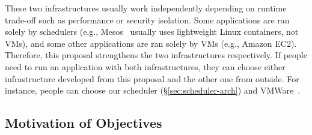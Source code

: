 These two infrastructures usually work independently depending on 
runtime trade-off such as performance or security isolation. Some applications 
are ran solely by schedulers (e.g., Mesos~\cite{mesos:nsdi11} usually uses 
lightweight Linux containers, not VMs), and some other applications are ran 
solely by VMs (e.g., Amazon EC2). Therefore, this proposal strengthens the 
two infrastructures respectively. If people need to run an application with 
both infrastructures, they can choose either infrastructure developed from 
this proposal and the other one from outside. For instance, people can choose 
our \tripod scheduler (\S\ref{sec:scheduler-arch}) and VMWare~\cite{esx:osdi02}.





% 




\vspace{-.15in}\subsection{Motivation of Objectives} 
\label{sec:motivation}\vspace{-.075in}

